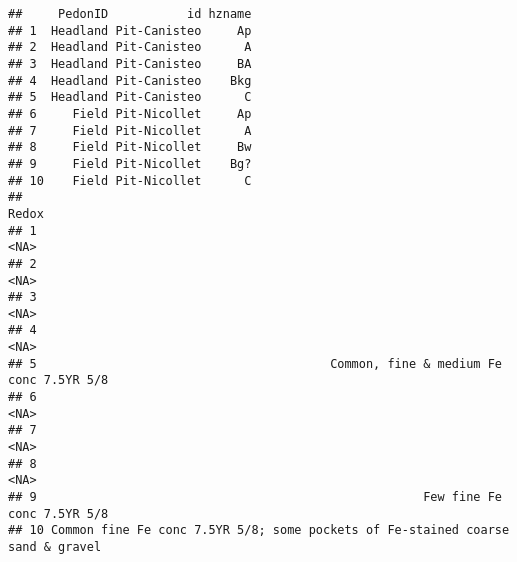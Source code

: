 \documentclass[
]{book}
\begin{document}
\begin{verbatim}
##     PedonID           id hzname
## 1  Headland Pit-Canisteo     Ap
## 2  Headland Pit-Canisteo      A
## 3  Headland Pit-Canisteo     BA
## 4  Headland Pit-Canisteo    Bkg
## 5  Headland Pit-Canisteo      C
## 6     Field Pit-Nicollet     Ap
## 7     Field Pit-Nicollet      A
## 8     Field Pit-Nicollet     Bw
## 9     Field Pit-Nicollet    Bg?
## 10    Field Pit-Nicollet      C
##                                                                             Redox
## 1                                                                            <NA>
## 2                                                                            <NA>
## 3                                                                            <NA>
## 4                                                                            <NA>
## 5                                         Common, fine & medium Fe conc 7.5YR 5/8
## 6                                                                            <NA>
## 7                                                                            <NA>
## 8                                                                            <NA>
## 9                                                      Few fine Fe conc 7.5YR 5/8
## 10 Common fine Fe conc 7.5YR 5/8; some pockets of Fe-stained coarse sand & gravel
\end{verbatim}
\end{document}
